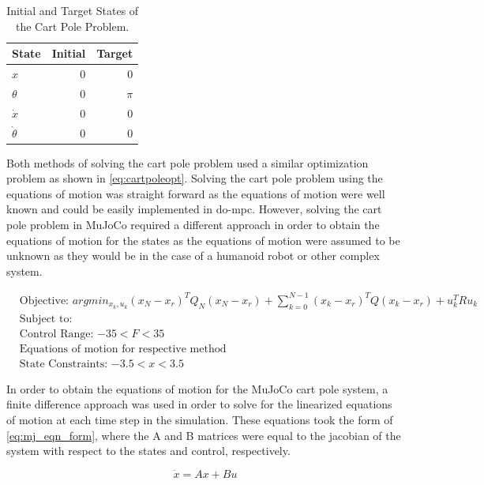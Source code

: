 \documentclass{./springer/svjour3}
\begin{document}
\begin{table}[h]
  \centering
  \caption{Initial and Target States of the Cart Pole Problem.}
  \begin{tabular}{lrr}
  \toprule
  State & Initial & Target\\
  \midrule
  $x$ & 0  & 0\\
  $\theta$ & 0 & $\pi$ \\
  $\dot{x}$ & 0 & 0\\
  $\dot{\theta}$ & 0 & 0\\
  \end{tabular}
  \label{tab:init_tar_carteqn}
\end{table}

Both methods of solving the cart pole problem used a similar optimization problem as shown in \ref{eq:cartpoleopt}. 
Solving the cart pole problem using the equations of motion was straight forward as the equations of motion were well known and could be easily implemented in do-mpc.
However, solving the cart pole problem in MuJoCo required a different approach in order to obtain the equations of motion for the states as the equations of motion 
were assumed to be unknown as they would be in the case of a humanoid robot or other complex system.

\begin{equation}
  \begin{aligned}
  &\text{Objective: $arg min_{x_k,u_k} (x_N - x_r)^TQ_N(x_N - x_r) + \sum_{k = 0}^{N-1} (x_k - x_r)^TQ(x_k - x_r) + u_k^TRu_k $}\\
  &\text{Subject to:}\\
  &\text{Control Range: $-35 < F < 35$}\\
  &\text{Equations of motion for respective method}\\
  &\text{State Constraints: $-3.5 < x < 3.5$}
  \end{aligned}
  \label{eq:cartpoleopt}
\end{equation}

In order to obtain the equations of motion for the MuJoCo cart pole system, a finite difference approach was used in order to solve for the linearized equations of motion at 
each time step in the simulation. These equations took the form of \ref{eq:mj_eqn_form}, where the A and B matrices were equal to the jacobian of the system 
with respect to the states and 
control, respectively.

\begin{equation}
  \dot{x} = Ax + Bu
  \label{eq:mj_eqn_form}
\end{equation}
\end{document}
